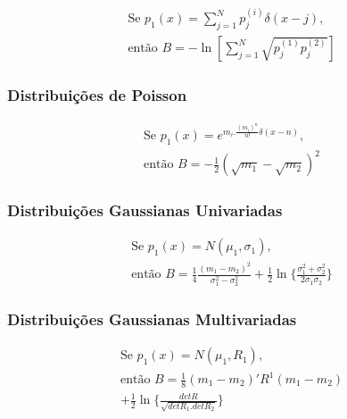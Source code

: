 \documentclass{sbrt2017port}
\begin{document}
\begin{equation}\label{eq58}
	\begin{split}
		\text{Se } p_1(x) = \sum_{j=1}^{N}p_j^{(i)}\delta(x-j), \\
		\text{então } B = -\ln [\sum_{j=1}^{N} \sqrt{p_j^{(1)}p_j^{(2)}}]
	\end{split}
\end{equation}

\subsubsection{Distribuições de Poisson}

\begin{equation}\label{eq59}
	\begin{split}
		\text{Se } p_1(x) = e^{m_i . \frac{(m_i)^n}{n!}\delta(x-n)}, \\
		\text{então } B = - \frac{1}{2} (\sqrt{m_1}-\sqrt{m_2})^2
	\end{split}
\end{equation}

\subsubsection{Distribuições Gaussianas Univariadas}


\begin{equation}\label{eq60}
	\begin{split}
		\text{Se } p_1(x) = N(\mu_1,\sigma_1), \\
		\text{então } B = \frac{1}{4} \frac{(m_1-m_2)^2}{\sigma_1^2-\sigma_2^2} + \frac{1}{2} \ln \{\frac{\sigma_1^2+\sigma_2^2}{2\sigma_1\sigma_2}\}
	\end{split}
\end{equation}

\subsubsection{Distribuições Gaussianas Multivariadas}


\begin{equation}\label{eq61}
	\begin{split}
		\text{Se } p_1(x) = N(\mu_1,R_1), \\
		\text{então } B = \frac{1}{8} (m_1-m_2)'R^{1}(m_1-m_2) \\
		 + \frac{1}{2} \ln \{\frac{det R}{\sqrt{det R_1. det R_2}}\}
	\end{split}
\end{equation}
\end{document}

